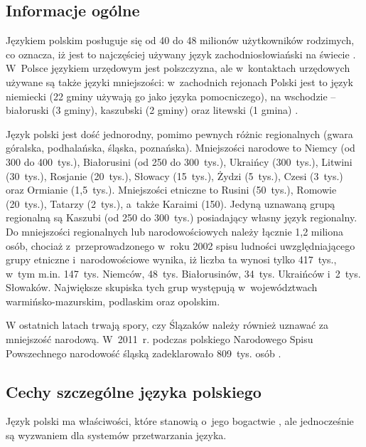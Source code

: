 \begin{multicols}{2} 

\subsection{Informacje ogólne} 

Językiem polskim posługuje się od 40 do 48 milionów użytkowników
rodzimych, co oznacza, iż jest to najczęściej używany język
zachodniosłowiański na świecie \cite{Eur1}. W~Polsce językiem
urzędowym jest polszczyzna, ale w~kontaktach urzędowych używane są
także języki mniejszości: w~zachodnich rejonach Polski jest to
język niemiecki (22 gminy używają go jako języka pomocniczego), na
wschodzie -- białoruski (3 gminy), kaszubski (2 gminy) oraz litewski
(1 gmina) \cite{Efnil1}. 


Język polski jest dość jednorodny, pomimo pewnych różnic
regionalnych (gwara góralska, podhalańska, śląska, poznańska).
Mniejszości narodowe to Niemcy (od 300 do 400~tys.), Białorusini (od
250 do 300~tys.), Ukraińcy (300~tys.), Litwini (30~tys.), Rosjanie
(20~tys.), Słowacy (15~tys.), Żydzi (5~tys.), Czesi (3~tys.) oraz
Ormianie (1,5~tys.). Mniejszości etniczne to Rusini (50~tys.),
Romowie (20~tys.), Tatarzy (2~tys.), a~także Karaimi (150). Jedyną
uznawaną grupą regionalną są Kaszubi (od 250 do 300~tys.)
posiadający własny język regionalny. Do mniejszości regionalnych
lub narodowościowych należy łącznie 1,2 miliona osób, chociaż
z~przeprowadzonego w~roku 2002 spisu ludności uwzględniającego
grupy etniczne i~narodowościowe wynika, iż liczba ta wynosi tylko
417~tys., w~tym m.in. 147~tys. Niemców, 48~tys. Białorusinów,
34~tys. Ukraińców i~2~tys. Słowaków. Największe skupiska tych
grup występują w~województwach warmińsko-mazurskim, podlaskim oraz
opolskim. 

W ostatnich latach trwają spory, czy Ślązaków należy również
uznawać za mniejszość narodową. W~2011~r. podczas polskiego
Narodowego Spisu Powszechnego narodowość śląską zadeklarowało
809~tys. osób \cite{gus1}. 

\subsection{Cechy szczególne języka polskiego} 

Język polski ma właściwości, które stanowią o~jego bogactwie
\cite{Pisarek2007}, ale jednocześnie są wyzwaniem dla systemów
przetwarzania języka. 


\end{multicols}
